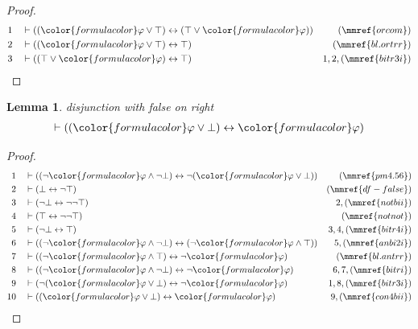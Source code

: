 \documentclass{article}
\theoremstyle{plain}
\newtheorem{lemma}{Theorem}[section]
\newtheorem{lemma}[theorem]{Lemma}
\begin{document}
\begin{proof}
\begin{align}
  1 && & \vdash ( ( {\color{formulacolor}\varphi} \vee \top ) \leftrightarrow (
      \top \vee {\color{formulacolor}\varphi} )
      )&(\mmref{orcom})\notag
  \\ 2 && & \vdash ( ( {\color{formulacolor}\varphi} \vee \top )
      \leftrightarrow \top )&(\mmref{bl.ortrr})\notag
  \\ 3 && & \vdash ( ( \top \vee {\color{formulacolor}\varphi} )
      \leftrightarrow \top )&1,2,(\mmref{bitr3i})\notag
\end{align}
\end{proof}

\begin{lemma} disjunction with false  on right
\begin{align}
\vdash ( ( {\color{formulacolor}\varphi} \vee \bot ) \leftrightarrow
    {\color{formulacolor}\varphi} )\label{bl.orfar}
\end{align}
\end{lemma}

\begin{proof}
\begin{align}
  1 && & \vdash ( ( \lnot {\color{formulacolor}\varphi} \wedge \lnot \bot )
      \leftrightarrow \lnot ( {\color{formulacolor}\varphi}
      \vee \bot ) )&(\mmref{pm4.56})\notag
  \\ 2 && & \vdash ( \bot \leftrightarrow \lnot \top
      )&(\mmref{df-false})\notag
  \\ 3 && & \vdash ( \lnot \bot \leftrightarrow \lnot \lnot \top
      )&2,(\mmref{notbii})\notag
  \\ 4 && & \vdash ( \top \leftrightarrow \lnot \lnot \top
      )&(\mmref{notnot})\notag
  \\ 5 && & \vdash ( \lnot \bot \leftrightarrow \top
      )&3,4,(\mmref{bitr4i})\notag
  \\ 6 && & \vdash ( ( \lnot {\color{formulacolor}\varphi} \wedge \lnot \bot )
      \leftrightarrow ( \lnot {\color{formulacolor}\varphi}
      \wedge \top ) )&5,(\mmref{anbi2i})\notag
  \\ 7 && & \vdash ( ( \lnot {\color{formulacolor}\varphi} \wedge \top )
      \leftrightarrow \lnot {\color{formulacolor}\varphi}
      )&(\mmref{bl.antrr})\notag
  \\ 8 && & \vdash ( ( \lnot {\color{formulacolor}\varphi} \wedge \lnot \bot )
      \leftrightarrow \lnot {\color{formulacolor}\varphi}
      )&6,7,(\mmref{bitri})\notag
  \\ 9 && & \vdash ( \lnot ( {\color{formulacolor}\varphi} \vee \bot )
      \leftrightarrow \lnot {\color{formulacolor}\varphi}
      )&1,8,(\mmref{bitr3i})\notag
  \\ 10 && & \vdash ( ( {\color{formulacolor}\varphi} \vee \bot )
      \leftrightarrow {\color{formulacolor}\varphi}
      )&9,(\mmref{con4bii})\notag
\end{align}
\end{proof}
\end{document}
